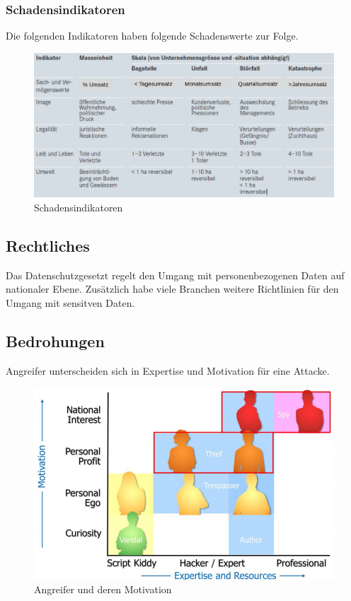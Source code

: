 \newpage

\subsubsection{Schadensindikatoren}
Die folgenden Indikatoren haben folgende Schadenswerte zur Folge.
\begin{figure}[h!]
	\centering
	\includegraphics[width=0.9\linewidth]{images/ims_schadensindikatoren}
	\caption{Schadensindikatoren}
	\label{fig:imsschadensindikatoren}
\end{figure}


\subsection{Rechtliches}
Das Datenschutzgesetzt regelt den Umgang mit personenbezogenen Daten auf nationaler Ebene. Zusätzlich habe viele Branchen weitere Richtlinien für den Umgang mit sensitven Daten. 

\clearpage

\subsection{Bedrohungen}
Angreifer unterscheiden sich in Expertise und Motivation für eine Attacke.
\begin{figure}[h!]
	\centering
	\includegraphics[width=0.7\linewidth]{images/ims_attack_motivation}
	\caption{Angreifer und deren Motivation}
	\label{fig:imsattackmotivation}
\end{figure}


